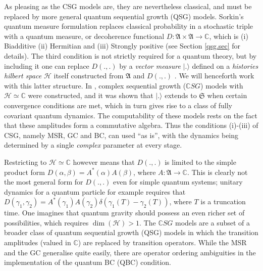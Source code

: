 \documentclass[11pt]{article}
\newcommand{\bC}{\mathbb C}
\newcommand{\cH}{\mathcal H}
\newcommand{\ket}[1]{| #1 \rangle}
\newcommand{\fA}{\mathfrak A}
\newcommand{\fS}{\mathfrak S}
\newcommand{\CSG}{\bC S G}
\begin{document}
 As pleasing as the CSG models are, they are  nevertheless classical,
 and must be replaced by more general quantum sequential growth (QSG)  models. Sorkin's quantum measure
 formulation \cite{qmeasureone,qmeasuretwo,dowgha} replaces classical
 probability in a  stochastic 
 triple with a quantum measure, or decoherence functional $D: \fA
 \times \fA \rightarrow \bC$, which is (i) Biadditive (ii) Hermitian
 and (iii) Strongly positive (see Section \ref{qsg.sec} for details). 
 The third condition is not strictly required for a quantum theory, but by including it one
 can replace $D(.,.)$ by a {\sl vector measure} $\ket{.}$ defined on
 a {\sl histories hilbert space} $\cH$ itself constructed from $\fA$ and
 $D(.,.)$ \cite{histories}. We will henceforth work with this latter structure.
In \cite{djs,sz}, complex sequential growth ($\CSG$) models with 
$\cH \simeq \bC$ were constructed,  and it was shown that  
$\ket{.}$ extends to $\fS$  when certain convergence conditions are
met, which in turn gives rise to a class of fully covariant quantum
dynamics. The computability of these models rests on the fact that
these amplitudes   form a commutative algebra. Thus the conditions
(i)-(iii) of CSG, namely MSR, GC
and BC, can used ``as is'', with the dynamics being determined
by a single {\it complex} parameter at every stage. 

Restricting to $\cH \simeq \bC$ however means that $D(.,.)$ 
is limited to the simple product form $ D(\alpha,\beta)=A^*(\alpha)
A(\beta)$, where $A:\fA \rightarrow \bC$.  This is clearly not the
most general form for $D(.,.)$ even for simple quantum systems;
unitary dynamics for a quantum particle for example requires that $ D(\gamma_1,\gamma_2)=A^*(\gamma_1)
A(\gamma_2) \delta (\gamma_1(T)-\gamma_2(T))$, where $T$ is a
truncation time. One imagines that quantum gravity should possess an
even  richer set of possibilities, which requires  $\dim(\cH) >1$.  The $\CSG$ models are a
subset of a broader class of quantum sequential growth (QSG)  models  
in which the transition amplitudes (valued in $\bC$) are replaced by transition
operators. While the MSR and the GC generalise quite easily, there are
operator ordering ambiguities  in the 
implementation of the quantum BC (QBC) condition. 
\end{document}
